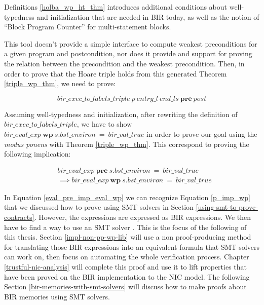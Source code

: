 \documentclass{kththesis}
\begin{document}
{Definitions \ref{holba_wp_ht_thm} introduces additional conditions about well-typedness and initialization that are needed in BIR today\footnotemark, as well as the notion of ``Block Program Counter'' for multi-statement blocks. %


This tool doesn't provide a simple interface to compute weakest preconditions for a given program and postcondition, nor does it provide and support for proving the relation between the precondition and the weakest precondition. Then, in order to prove that the Hoare triple holds from this generated Theorem \ref{triple_wp_thm}, we need to prove:

\begin{equation}
    bir\_exec\_to\_labels\_triple~p~entry\_l~end\_ls~\mathbf{pre}~post
    \label{triple_pre_thm}
\end{equation}

Assuming well-typedness and initialization, after rewriting the definition of $bir\_exec\_to\_labels\_triple$, we have to show $bir\_eval\_exp~\mathbf{wp}~s.bst\_environ~=~bir\_val\_true$ in order to prove our goal using the \textit{modus ponens} with Theorem \ref{triple_wp_thm}. This correspond to proving the following implication:

\begin{small}
    \begin{equation}
        \begin{split}
            &bir\_eval\_exp~\mathbf{pre}~s.bst\_environ~=~bir\_val\_true\\
            &\implies bir\_eval\_exp~\mathbf{wp}~s.bst\_environ~=~bir\_val\_true
        \end{split}
        \label{eval_pre_imp_eval_wp}
    \end{equation}
\end{small}

In Equation \ref{eval_pre_imp_eval_wp} we can recognize Equation \ref{p_imp_wp} that we discussed how to prove using \gls{SMT} solvers in Section \ref{using-smt-to-prove-contracts}. However, the expressions are expressed as BIR expressions. We then have to find a way to use an SMT solver \footnotemark. This is the focus of the following of this thesis. Section \ref{impl-non-pp-wp-lib} will use a non \gls{proof-producing} method for translating those BIR expressions into an equivalent formula that SMT solvers can work on, then focus on automating the whole verification process. Chapter \ref{trustful-nic-analysis} will complete this proof and use it to lift properties that have been proved on the BIR implementation to the \gls{NIC} model. The following Section \ref{bir-memories-with-smt-solvers} will discuss how to make proofs about BIR memories using \gls{SMT} solvers.

}
\end{document}
